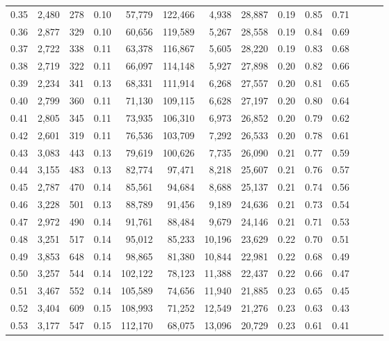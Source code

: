\begin{tabular}{rrrrrrrrrrrrrr}
0.35 &  2,480 &  278 &  0.10 &   57,779 &  122,466 &   4,938 &  28,887 &  0.19 &  0.85 &      0.71 \\
0.36 &  2,877 &  329 &  0.10 &   60,656 &  119,589 &   5,267 &  28,558 &  0.19 &  0.84 &      0.69 \\
0.37 &  2,722 &  338 &  0.11 &   63,378 &  116,867 &   5,605 &  28,220 &  0.19 &  0.83 &      0.68 \\
0.38 &  2,719 &  322 &  0.11 &   66,097 &  114,148 &   5,927 &  27,898 &  0.20 &  0.82 &      0.66 \\
0.39 &  2,234 &  341 &  0.13 &   68,331 &  111,914 &   6,268 &  27,557 &  0.20 &  0.81 &      0.65 \\
0.40 &  2,799 &  360 &  0.11 &   71,130 &  109,115 &   6,628 &  27,197 &  0.20 &  0.80 &      0.64 \\
0.41 &  2,805 &  345 &  0.11 &   73,935 &  106,310 &   6,973 &  26,852 &  0.20 &  0.79 &      0.62 \\
0.42 &  2,601 &  319 &  0.11 &   76,536 &  103,709 &   7,292 &  26,533 &  0.20 &  0.78 &      0.61 \\
0.43 &  3,083 &  443 &  0.13 &   79,619 &  100,626 &   7,735 &  26,090 &  0.21 &  0.77 &      0.59 \\
0.44 &  3,155 &  483 &  0.13 &   82,774 &   97,471 &   8,218 &  25,607 &  0.21 &  0.76 &      0.57 \\
0.45 &  2,787 &  470 &  0.14 &   85,561 &   94,684 &   8,688 &  25,137 &  0.21 &  0.74 &      0.56 \\
0.46 &  3,228 &  501 &  0.13 &   88,789 &   91,456 &   9,189 &  24,636 &  0.21 &  0.73 &      0.54 \\
0.47 &  2,972 &  490 &  0.14 &   91,761 &   88,484 &   9,679 &  24,146 &  0.21 &  0.71 &      0.53 \\
0.48 &  3,251 &  517 &  0.14 &   95,012 &   85,233 &  10,196 &  23,629 &  0.22 &  0.70 &      0.51 \\
0.49 &  3,853 &  648 &  0.14 &   98,865 &   81,380 &  10,844 &  22,981 &  0.22 &  0.68 &      0.49 \\
0.50 &  3,257 &  544 &  0.14 &  102,122 &   78,123 &  11,388 &  22,437 &  0.22 &  0.66 &      0.47 \\
0.51 &  3,467 &  552 &  0.14 &  105,589 &   74,656 &  11,940 &  21,885 &  0.23 &  0.65 &      0.45 \\
0.52 &  3,404 &  609 &  0.15 &  108,993 &   71,252 &  12,549 &  21,276 &  0.23 &  0.63 &      0.43 \\
0.53 &  3,177 &  547 &  0.15 &  112,170 &   68,075 &  13,096 &  20,729 &  0.23 &  0.61 &      0.41 \\

\end{tabular}
